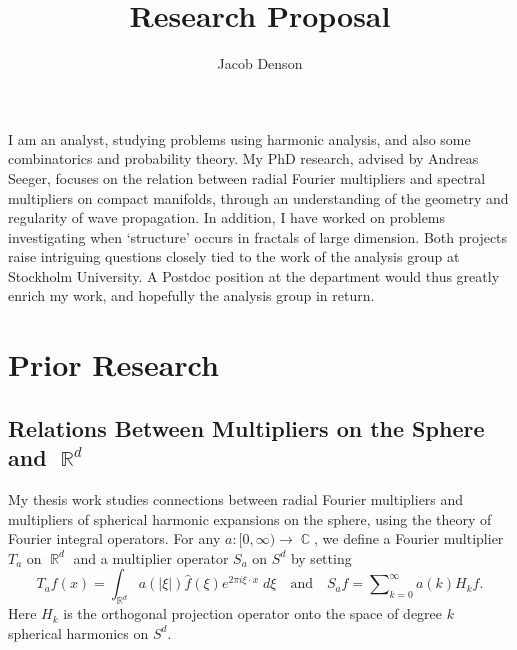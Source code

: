\documentclass[11pt]{article}
\title{\vspace{-2em}Research Proposal}
\author{Jacob Denson}
\date{}
\theoremstyle{definition}
\DeclareMathOperator{\RR}{\mathbb{R}}
\DeclareMathOperator{\CC}{\mathbb{C}}
\begin{document}
\maketitle

I am an analyst, studying problems using harmonic analysis, and also some combinatorics and probability theory. My PhD research, advised by Andreas Seeger, focuses on the relation between radial Fourier multipliers and spectral multipliers on compact manifolds, through an understanding of the geometry and regularity of wave propagation. In addition, I have worked on problems investigating when `structure' occurs in fractals of large dimension. Both projects raise intriguing questions closely tied to the work of the analysis group at Stockholm University. A Postdoc position at the department would thus greatly enrich my work, and hopefully the analysis group in return.

\section*{Prior Research}

\subsection*{Relations Between Multipliers on the Sphere and $\RR^d$}

My thesis work studies connections between radial Fourier multipliers and multipliers of spherical harmonic expansions on the sphere, using the theory of Fourier integral operators. For any $a: [0,\infty) \to \CC$, we define a Fourier multiplier $T_a$ on $\RR^d$ and a multiplier operator $S_a$ on $S^d$ by setting
%
\[ T_a f(x) = \int_{\RR^d} a ( |\xi| ) \widehat{f}(\xi) e^{2 \pi i \xi \cdot x}\; d \xi \quad\text{and}\quad S_a f = \sum\nolimits_{k = 0}^\infty a(k) H_k f. \]
%
Here $H_k$ is the orthogonal projection operator onto the space of degree $k$ spherical harmonics on $S^d$. %
\end{document}

